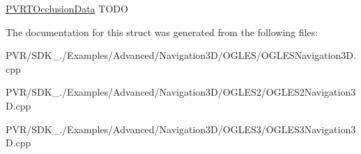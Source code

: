   \hyperlink{struct_p_v_r_t_occlusion_data}{P\+V\+R\+T\+Occlusion\+Data}  T\+O\+D\+O 

The documentation for this struct was generated from the following files\+:\begin{DoxyCompactItemize}
\item 
P\+V\+R/\+S\+D\+K\+\_./\+Examples/\+Advanced/\+Navigation3\+D/\+O\+G\+L\+E\+S/O\+G\+L\+E\+S\+Navigation3\+D.\+cpp\item 
P\+V\+R/\+S\+D\+K\+\_./\+Examples/\+Advanced/\+Navigation3\+D/\+O\+G\+L\+E\+S2/O\+G\+L\+E\+S2\+Navigation3\+D.\+cpp\item 
P\+V\+R/\+S\+D\+K\+\_./\+Examples/\+Advanced/\+Navigation3\+D/\+O\+G\+L\+E\+S3/O\+G\+L\+E\+S3\+Navigation3\+D.\+cpp\end{DoxyCompactItemize}
